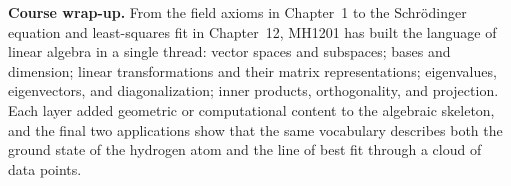 \documentclass[11pt, a4paper, notitlepage]{report}
\theoremstyle{definition}
\theoremstyle{remark}
\begin{document}
\medskip
\textbf{Course wrap-up.} From the field axioms in Chapter~1 to the
Schr\"odinger equation and least-squares fit in Chapter~12, MH1201 has
built the language of linear algebra in a single thread: vector spaces and
subspaces; bases and dimension; linear transformations and their matrix
representations; eigenvalues, eigenvectors, and diagonalization; inner
products, orthogonality, and projection. Each layer added geometric or
computational content to the algebraic skeleton, and the final two
applications show that the same vocabulary describes both the ground state
of the hydrogen atom and the line of best fit through a cloud of data points.
\end{document}
